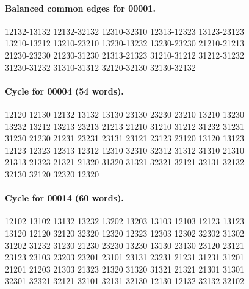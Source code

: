 \documentclass[11pt]{article}
\theoremstyle{remark}
\numberwithin{equation}{section}
\numberwithin{table}{section}
\begin{document}
\paragraph{Balanced common edges for 00001.}
\begingroup\footnotesize\ttfamily\begin{flushleft}
12132-13132 12132-32132 12310-32310 12313-12323 13123-23123\\
13210-13212 13210-23210 13230-13232 13230-23230 21210-21213\\
21230-23230 21230-31230 21313-21323 31210-31212 31212-31232\\
31230-31232 31310-31312 32120-32130 32130-32132\\
\end{flushleft}\endgroup
\paragraph{Cycle for 00004 (54 words).}
\begingroup\footnotesize\ttfamily\begin{flushleft}
12120 12130 12132 13132 13130 23130 23230 23210 13210 13230\\
13232 13212 13213 23213 21213 21210 31210 31212 31232 31231\\
31230 21230 21231 23231 23131 23121 23123 23120 13120 13123\\
12123 12323 12313 12312 12310 32310 32312 31312 31310 21310\\
21313 21323 21321 21320 31320 31321 32321 32121 32131 32132\\
32130 32120 32320 12320\\
\end{flushleft}\endgroup
\paragraph{Cycle for 00014 (60 words).}
\begingroup\footnotesize\ttfamily\begin{flushleft}
12102 13102 13132 13232 13202 13203 13103 12103 12123 13123\\
13120 12120 32120 32320 12320 12323 12303 12302 32302 31302\\
31202 31232 31230 21230 23230 13230 13130 23130 23120 23121\\
23123 23103 23203 23201 23101 23131 23231 21231 31231 31201\\
21201 21203 21303 21323 21320 31320 31321 21321 21301 31301\\
32301 32321 32121 32101 32131 32130 12130 12132 32132 32102\\
\end{flushleft}\endgroup
\end{document}
